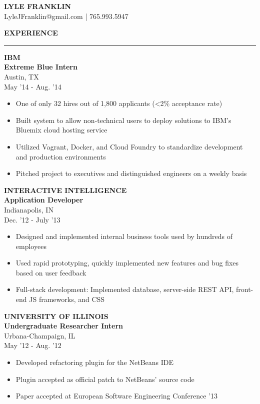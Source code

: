 \documentclass[a4paper,10pt]{article}
\newcommand{\name}[1]{\textbf{\huge{#1}}}
\newcommand{\header}[1]
{
\vspace{0.40in}
{\Large \textbf {\uppercase{#1}}}
\vspace{0.05in}
\hrule
\vspace{0.15in}
}
\newenvironment{details}
{\begin{itemize}[label=\scalebox{.5}{\ding{117}},leftmargin=0.15in]}
{\end{itemize}}
\begin{document}
\name{LYLE FRANKLIN}\\
\indent
LyleJFranklin@gmail.com | 765.993.5947

\begin{minipage}[t]{0.5\textwidth}
\header{Experience}


\textbf{IBM\\Extreme Blue Intern}\\
Austin, TX\\
May '14 - Aug. '14

\begin{details}
  \item One of only 32 hires out of 1,800 applicants (\textless2\% acceptance rate)
  \item Built system to allow non-technical users to deploy solutions to IBM's Bluemix cloud hosting service
  \item Utilized Vagrant, Docker, and Cloud Foundry to standardize development and production environments
  \item Pitched project to executives and distinguished engineers on a weekly basis 
\end{details}

\textbf{INTERACTIVE INTELLIGENCE\\Application Developer}\\
Indianapolis, IN\\
Dec. '12 - July '13

\begin{details}
  \item Designed and implemented internal business tools used by hundreds of employees
  \item Used rapid prototyping, quickly implemented new features and bug fixes based on user feedback
  \item Full-stack development: Implemented database, server-side REST API, front-end JS frameworks, and CSS
\end{details}


\textbf{UNIVERSITY OF ILLINOIS\\Undergraduate Researcher Intern}\\
Urbana-Champaign, IL\\
May '12 - Aug. '12

\begin{details}
  \item Developed refactoring plugin for the NetBeans IDE
  \item Plugin accepted as official patch to NetBeans’ source code
  \item Paper accepted at European Software Engineering Conference '13
\end{details}


\end{minipage}
\end{document}
